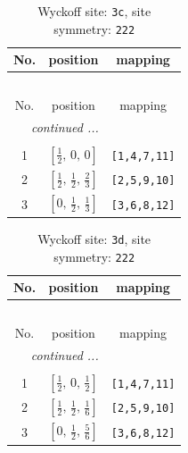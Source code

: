 \documentclass[fleqn,8pt]{jsarticle}
\begin{document}
\renewcommand{\arraystretch}{1.2}
\begin{longtable}{ccc}
\caption{Wyckoff site: {\tt 3c}, site symmetry: {\tt 222}}
 \\
 \hline \hline
No. & position & mapping \\ \hline \endfirsthead

\multicolumn{2}{l}{\tablename\ \thetable{}} \\
 \hline \hline
No. & position & mapping \\ \hline \endhead

 \hline \hline
\multicolumn{2}{r}{\footnotesize\it continued ...} \\ \endfoot

 \hline \hline
\multicolumn{2}{r}{} \\ \endlastfoot

1 & $\left[ \frac{1}{2},\, 0,\, 0 \right]$ & {\tt [1,4,7,11]} \\ \hline
2 & $\left[ \frac{1}{2},\, \frac{1}{2},\, \frac{2}{3} \right]$ & {\tt [2,5,9,10]} \\ \hline
3 & $\left[ 0,\, \frac{1}{2},\, \frac{1}{3} \right]$ & {\tt [3,6,8,12]} \\
\end{longtable}
\renewcommand{\arraystretch}{1.2}
\begin{longtable}{ccc}
\caption{Wyckoff site: {\tt 3d}, site symmetry: {\tt 222}}
 \\
 \hline \hline
No. & position & mapping \\ \hline \endfirsthead

\multicolumn{2}{l}{\tablename\ \thetable{}} \\
 \hline \hline
No. & position & mapping \\ \hline \endhead

 \hline \hline
\multicolumn{2}{r}{\footnotesize\it continued ...} \\ \endfoot

 \hline \hline
\multicolumn{2}{r}{} \\ \endlastfoot

1 & $\left[ \frac{1}{2},\, 0,\, \frac{1}{2} \right]$ & {\tt [1,4,7,11]} \\ \hline
2 & $\left[ \frac{1}{2},\, \frac{1}{2},\, \frac{1}{6} \right]$ & {\tt [2,5,9,10]} \\ \hline
3 & $\left[ 0,\, \frac{1}{2},\, \frac{5}{6} \right]$ & {\tt [3,6,8,12]} \\
\end{longtable}
\renewcommand{\arraystretch}{1.2}
\end{document}
